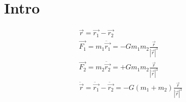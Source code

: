 

\section{Intro}

\begin{align}\label{eq:Zweikoerperproblem}
\vec{r} = \vec{r_1} - \vec{r_2}\\
\vec{F_1} = m_1 \ddot{\vec{r_1}} = - G m_1 m_2 \frac{\vec{r}}{|\vec{r}|^3}\\
\vec{F_2} = m_2 \ddot{\vec{r_2}} = + G m_1 m_2 \frac{\vec{r}}{|\vec{r}|^3}\\[.25cm]
\ddot{\vec{r}} = \ddot{\vec{r_1}} - \ddot{\vec{r_2}} = - G(m_1 + m_2) \frac{\vec{r}}{|\vec{r}|^3}
\end{align}

